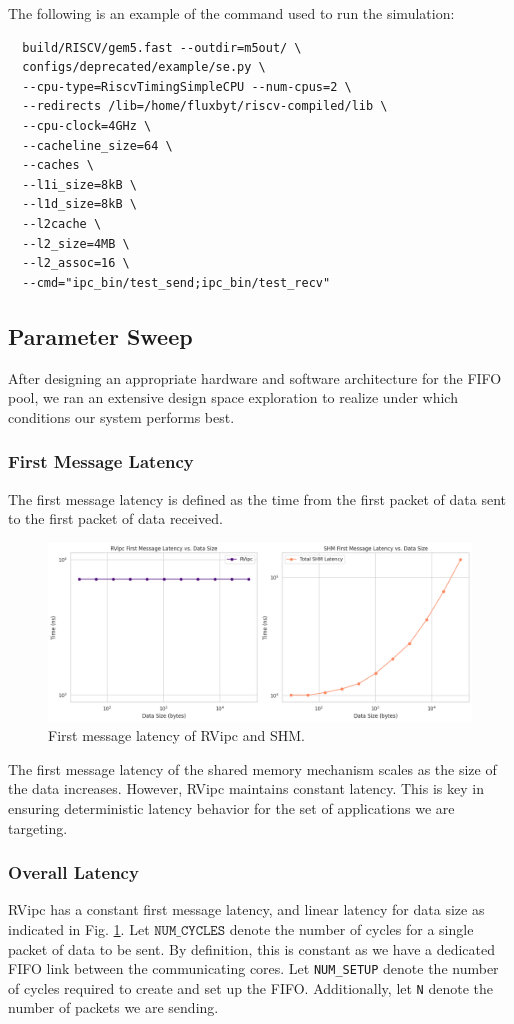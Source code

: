 The following is an example of the command used to run the simulation:
\begin{verbatim}
  build/RISCV/gem5.fast --outdir=m5out/ \
  configs/deprecated/example/se.py \
  --cpu-type=RiscvTimingSimpleCPU --num-cpus=2 \
  --redirects /lib=/home/fluxbyt/riscv-compiled/lib \
  --cpu-clock=4GHz \
  --cacheline_size=64 \
  --caches \
  --l1i_size=8kB \
  --l1d_size=8kB \
  --l2cache \
  --l2_size=4MB \
  --l2_assoc=16 \
  --cmd="ipc_bin/test_send;ipc_bin/test_recv"
\end{verbatim}

\subsection{Parameter Sweep}

After designing an appropriate hardware and software architecture for the FIFO pool, we ran an extensive design space exploration to realize under which conditions our system performs best. 

\subsubsection{First Message Latency}
The first message latency is defined as the time from the first packet of data sent to the first packet of data received.

\begin{figure}[h]
  \centering
  \includegraphics[width=1\linewidth]{figures/first-message-lat.png}
  \caption{First message latency of RVipc and SHM.}
  \label{fig:first_byte_latency}
\end{figure}

The first message latency of the shared memory mechanism scales as the size of the data increases. However, RVipc maintains constant latency. This is key in ensuring deterministic latency behavior for the set of applications we are targeting.

\subsubsection{Overall Latency}
RVipc has a constant first message latency, and linear latency for data size as indicated in Fig. \ref{fig:first_byte_latency}. Let $\texttt{NUM\_CYCLES}$ denote the number of cycles for a single packet of data to be sent. By definition, this is constant as we have a dedicated FIFO link between the communicating cores. Let \texttt{NUM\_SETUP} denote the number of cycles required to create and set up the FIFO. Additionally, let \texttt{N} denote the number of packets we are sending.



